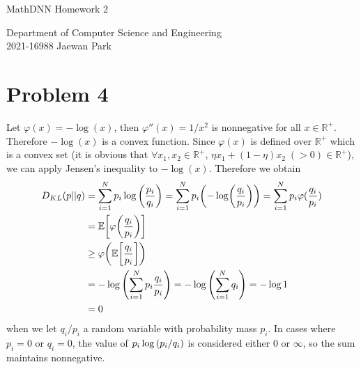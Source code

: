 \documentclass[10pt]{article}
\begin{document}
\begin{center}
    {\LARGE MathDNN Homework 2} \\
\end{center}
\begin{flushright}
    Department of Computer Science and Engineering \\
    2021-16988 Jaewan Park
\end{flushright}

\section*{Problem 4}
Let $\varphi(x) = -\log(x)$, then $\varphi''(x) = 1/x^2$ is nonnegative for all $x \in \mathbb{R}^+$. Therefore $-\log(x)$ is a convex function.
Since $\varphi(x)$ is defined over $\mathbb{R}^+$ which is a convex set (it is obvious that $\forall x_1, x_2 \in \mathbb{R}^+$, $\eta x_1 + (1-\eta)x_2 \;(> 0) \in \mathbb{R}^+$), we can apply Jensen's inequality to $-\log(x)$.
Therefore we obtain
\begin{align*}
    D_{KL}(p||q) &= \sum_{i=1}^{N}p_i\log\qty(\frac{p_i}{q_i}) = \sum_{i=1}^{N}p_i\qty(-\log(\frac{q_i}{p_i})) = \sum_{i=1}^{N}p_i\varphi(\frac{q_i}{p_i})\\
    &= \mathbb{E}\qty[\varphi\qty(\frac{q_i}{p_i})] \\
    &\geq \varphi\qty(\mathbb{E}\qty[\frac{q_i}{p_i}]) \\
    &= -\log\qty(\sum_{i=1}^{N}p_i\frac{q_i}{p_i}) = -\log\qty(\sum_{i=1}^{N}q_i) = -\log 1 \\
    &= 0
\end{align*}
when we let ${q_i}/{p_i}$ a random variable with probability mass $p_i$.
In cases where $p_i = 0$ or $q_i = 0$, the value of $p_i\log\qty(p_i/q_i)$ is considered either $0$ or $\infty$, so the sum maintains nonnegative.
\end{document}
